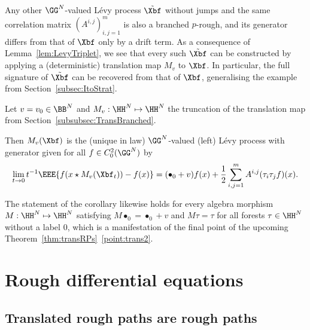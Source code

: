 \documentclass{article}
\begin{document}
Any other $\GG^N$-valued L{\'e}vy process $\tilde \Xbf$ without jumps and the same correlation matrix $(A^{i,j})_{i,j=1}^m$ is also a branched $p$-rough, and its generator differs from that of $\Xbf$ only by a drift term. As a consequence of Lemma~\ref{lem:LevyTriplet}, we see that every such $\tilde \Xbf$ can be constructed by applying a (deterministic) translation map $M_v$ to $\Xbf$. In particular, the full signature of $\tilde \Xbf$ can be recovered from that of $\Xbf$, generalising the example from Section~\ref{subsec:ItoStrat}.


\begin{corollary}
Let $v = v_0 \in \BB^N$ and $M_v : \HH^N \mapsto \HH^N$ the truncation of the translation map from Section~\ref{subsubsec:TransBranched}.

Then $M_v(\Xbf)$ is the (unique in law) $\GG^N$-valued (left) L{\'e}vy process with generator given for all $f \in C^2_0(\GG^N)$ by
\begin{equation*}
\lim_{t \rightarrow 0} t^{-1}\EEE{f(x \star M_v(\Xbf_t)) - f(x)} = (\bullet_0 + v) f (x) + \frac{1}{2}\sum_{i,j=1}^m A^{i,j} (\tau_i\tau_j f)(x).
\end{equation*}
\end{corollary}

\begin{remark}
The statement of the corollary likewise holds for every algebra morphism $M : \HH^N \mapsto \HH^N$ satisfying $M\bullet_0 = \bullet_0 + v$ and $M\tau = \tau$ for all forests $\tau \in \HH^N$ without a label $0$, which is a manifestation of the final point of the upcoming Theorem~\ref{thm:transRPs}~\ref{point:trans2}.
\end{remark}


\section{Rough differential equations} \label{sec:RDE}

\subsection{Translated rough paths are rough paths}
\end{document}
